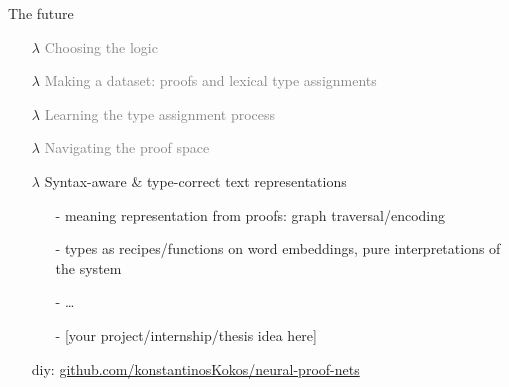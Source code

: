 \documentclass{beamer}
\begin{document}
\begin{frame}{The future}

\smaller
\begin{itemize}
	\item[$\lambda$] \textcolor{gray}{Choosing the logic}
	\item[$\lambda$] \textcolor{gray}{Making a dataset: proofs and lexical type assignments}
	\item[$\lambda$] \textcolor{gray}{Learning the type assignment process}
	\item[$\lambda$] \textcolor{gray}{Navigating the proof space}
	\item[$\lambda$] \alert{Syntax-aware \& type-correct text representations}\\
	\pause
	{\smaller
	\begin{itemize}
	 	 \item[-] meaning representation from proofs: graph traversal/encoding
	 	 \item[-] types as recipes/functions on word embeddings, pure interpretations of the system
	 	 \item[-] \dots
	 	 \item[-] {[your project/internship/thesis idea here]}
	\end{itemize}
	}
	\vfill
	
\flushright	diy: \url{github.com/konstantinosKokos/neural-proof-nets}
\end{itemize}\end{frame}
\end{document}
